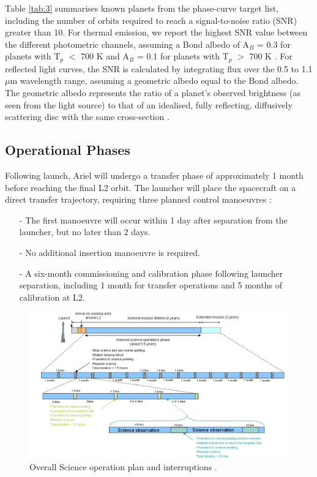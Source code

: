 \documentclass[12pt]{article}
\begin{document}
Table \ref{tab:3} summarises known planets from the phase-curve target list, including the number of orbits required to reach a signal-to-noise ratio (SNR) greater than 10. For thermal emission,
we report the highest SNR value between the different photometric channels, assuming a Bond albedo of A$_B$ = 0.3 for planets with T$_p$ $<$ 700 K and A$_B$ = 0.1 for planets with T$_p$ $>$ 700 K \cite{salvignol2024ariel}. 
For reflected light curves, the SNR is calculated by integrating flux over the 0.5 to 1.1 $\mu$m wavelength range, assuming a geometric albedo equal to the Bond albedo. The geometric albedo represents the ratio of a planet's observed brightness (as seen from the light source) to that of an idealised,
fully reflecting, diffusively scattering disc with the same cross-section \cite{salvignol2024ariel}.

\subsection{Operational Phases} \label{sec:2.3}

Following launch, Ariel will undergo a transfer phase of approximately 1 month before reaching the final L2 orbit. The launcher will place the spacecraft on a direct transfer trajectory, requiring three planned control manoeuvres \cite{salvignol2024ariel}:

\begin{itemize}
    \item[-] The first manoeuvre will occur within 1 day after separation from the launcher, but no later than 2 days.
    \item[-] No additional insertion manoeuvre is required.
    \item[-] A six-month commissioning and calibration phase following launcher separation, including 1 month for transfer operations and 5 months of calibration at L2.
\end{itemize}

\begin{figure}[H]
    \centering
    \includegraphics[width=.9\textwidth]{science interruptions.png}
    \caption{\centering Overall Science operation plan and interruptions \protect\cite{salvignol2024ariel}.}
    \label{fig:7}
\end{figure}
\end{document}
